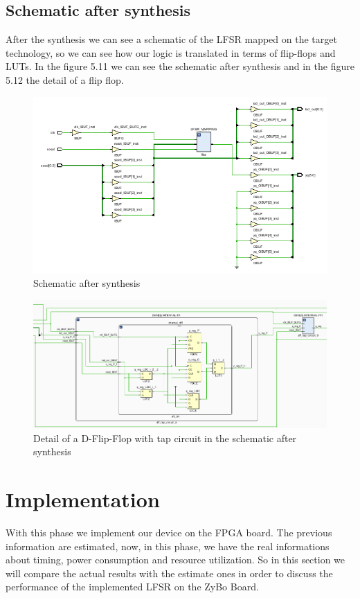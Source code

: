 \documentclass[a4paper]{report}
\begin{document}
\subsection{Schematic after synthesis}
After the synthesis we can see a schematic of the LFSR mapped on the target technology, so we can see how our logic is translated in terms of flip-flops and LUTs. In the figure 5.11 we can see the schematic after synthesis and in the figure 5.12 the detail of a flip flop.
\begin{figure}[htpb]
	\centering
	\includegraphics[scale=0.8]{img/vivado/schematic_after_synthesis.png}
	\caption{Schematic after synthesis}
\end{figure}
\begin{figure}[htpb]
	\centering
	\includegraphics[scale=0.6]{img/vivado/detail_of_schematic_after_synthesis.png}
	\caption{Detail of a D-Flip-Flop with tap circuit in the schematic after synthesis}
\end{figure}

\section{Implementation}
With this phase we implement our device on the FPGA board. The previous information are estimated, now, in this phase, we have the real informations about timing, power consumption and resource utilization. So in this section we will compare the actual results with the estimate ones in order to discuss the performance of the implemented LFSR on the ZyBo Board.
\end{document}

